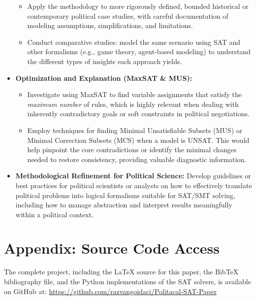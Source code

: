 \documentclass[11pt, a4paper]{article}
\begin{document}
\begin{itemize}
        \begin{itemize}
            \item Apply the methodology to more rigorously defined, bounded historical or contemporary political case studies, with careful documentation of modeling assumptions, simplifications, and limitations.
            \item Conduct comparative studies: model the same scenario using SAT and other formalisms (e.g., game theory, agent-based modeling) to understand the different types of insights each approach yields.
        \end{itemize}
    \item \textbf{Optimization and Explanation (MaxSAT \& MUS):}
        \begin{itemize}
            \item Investigate using MaxSAT to find variable assignments that satisfy the \textit{maximum number} of rules, which is highly relevant when dealing with inherently contradictory goals or soft constraints in political negotiations.
            \item Employ techniques for finding Minimal Unsatisfiable Subsets (MUS) or Minimal Correction Subsets (MCS) when a model is UNSAT. This would help pinpoint the core contradictions or identify the minimal changes needed to restore consistency, providing valuable diagnostic information.
        \end{itemize}
    \item \textbf{Methodological Refinement for Political Science:} Develop guidelines or best practices for political scientists or analysts on how to effectively translate political problems into logical formalisms suitable for SAT/SMT solving, including how to manage abstraction and interpret results meaningfully within a political context.
\end{itemize}

\printbibliography

\appendix
\section{Appendix: Source Code Access} \label{app:sourcecode_access}

The complete project, including the LaTeX source for this paper, the BibTeX bibliography file, and the Python implementations of the SAT solvers, is available on GitHub at:
\url{https://github.com/razvangoidaci/Politacal-SAT-Paper}
\end{document}
